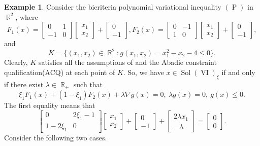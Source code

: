 \documentclass[]{interact}
\theoremstyle{plain}%
\theoremstyle{definition}
\newtheorem{example}{Example}[section]
\DeclareMathOperator{\Sol}{Sol}
\DeclareMathOperator{\Po}{P}
\DeclareMathOperator{\VI}{VI}
\DeclareMathOperator{\R}{\mathbb{R}}
\begin{document}
\begin{example}
	Consider the bicriteria polynomial variational inequality $(\Po)$ in $\R^2$, where 
	$$F_1(x)=\begin{bmatrix}0 & 1 \\ 
	-1 &  0
	\end{bmatrix}\begin{bmatrix}x_1 \\ 
	x_2
	\end{bmatrix}+\begin{bmatrix}
	0\\ 
	-1
	\end{bmatrix},F_2(x)=\begin{bmatrix}0& -1 \\ 
	1 & 0
	\end{bmatrix}\begin{bmatrix}x_1 \\ 
	x_2
	\end{bmatrix}+\begin{bmatrix}
	0\\ 
	-1
	\end{bmatrix},$$ 
	and 
	$$K=\{(x_1,x_2)\in\R^2:g(x_1,x_2)=x_1^2-x_2-4\leq 0\}.$$
	Clearly, $K$ satisfies all the assumptions of \cite[Proposition 1.3.4]{FaPa03} and the Abadie constraint qualification{\rm(ACQ)} at each point of $K$. So, we have
	$x\in\Sol(\VI)_{\xi}$ if and only if there exist $\lambda\in \R_+$ such that 
	$$\xi_1F_1(x)+(1-\xi_1)F_2(x)+\lambda\nabla g(x)=0,\ \lambda g(x)=0,\ g(x) \leq 0.$$
	The first equality means that
	\begin{equation}\label{equation_matrix}
	\begin{bmatrix}0 & 2\xi_1- 1 \\ 
	1-2\xi_1 &  0
	\end{bmatrix}\begin{bmatrix}x_1 \\ 
	x_2
	\end{bmatrix}+\begin{bmatrix}
	0\\ 
	-1
	\end{bmatrix}+\begin{bmatrix}
	2\lambda x_1\\ 
	-\lambda
	\end{bmatrix}=\begin{bmatrix}
	0\\ 
	0
	\end{bmatrix}.
	\end{equation}
	Consider the following two cases.
	\begin{enumerate}

\end{enumerate}
\end{example}
\end{document}
